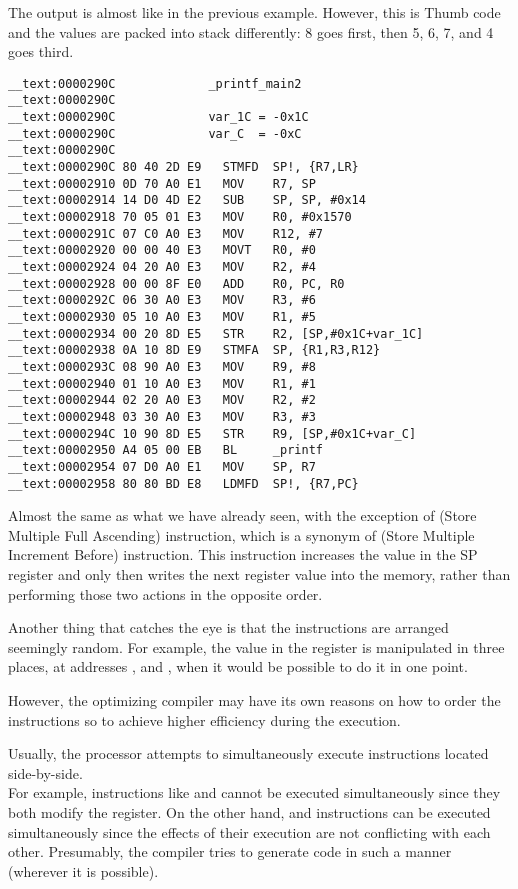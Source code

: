 The output is almost like in the previous example. However, this is Thumb code and the values are packed into stack differently: 
8 goes first, then 5, 6, 7, and 4 goes third.

\myparagraph{\OptimizingXcodeIV: \ARMMode}

\begin{lstlisting}[style=customasmARM]
__text:0000290C             _printf_main2
__text:0000290C
__text:0000290C             var_1C = -0x1C
__text:0000290C             var_C  = -0xC
__text:0000290C
__text:0000290C 80 40 2D E9   STMFD  SP!, {R7,LR}
__text:00002910 0D 70 A0 E1   MOV    R7, SP
__text:00002914 14 D0 4D E2   SUB    SP, SP, #0x14
__text:00002918 70 05 01 E3   MOV    R0, #0x1570
__text:0000291C 07 C0 A0 E3   MOV    R12, #7
__text:00002920 00 00 40 E3   MOVT   R0, #0
__text:00002924 04 20 A0 E3   MOV    R2, #4
__text:00002928 00 00 8F E0   ADD    R0, PC, R0
__text:0000292C 06 30 A0 E3   MOV    R3, #6
__text:00002930 05 10 A0 E3   MOV    R1, #5
__text:00002934 00 20 8D E5   STR    R2, [SP,#0x1C+var_1C]
__text:00002938 0A 10 8D E9   STMFA  SP, {R1,R3,R12}
__text:0000293C 08 90 A0 E3   MOV    R9, #8
__text:00002940 01 10 A0 E3   MOV    R1, #1
__text:00002944 02 20 A0 E3   MOV    R2, #2
__text:00002948 03 30 A0 E3   MOV    R3, #3
__text:0000294C 10 90 8D E5   STR    R9, [SP,#0x1C+var_C]
__text:00002950 A4 05 00 EB   BL     _printf
__text:00002954 07 D0 A0 E1   MOV    SP, R7
__text:00002958 80 80 BD E8   LDMFD  SP!, {R7,PC}
\end{lstlisting}

Almost the same as what we have already seen, with the
exception of  (Store Multiple Full Ascending) instruction, which is a synonym of  (Store Multiple Increment Before) instruction. 
This instruction increases the value in the \ac{SP} register and only then writes the next register value into the memory, rather than performing those two actions in the opposite order.

Another thing that catches the eye is that the instructions are arranged seemingly random.
For example, the value in the  register is manipulated in three
places, at addresses ,  and , when it would be possible to do it in one point.

However, the optimizing compiler may have its own reasons on how to order the instructions so to achieve higher efficiency during the execution.

Usually, the processor attempts to simultaneously execute instructions located side-by-side.\\
For example, instructions like  and
 cannot be executed simultaneously since they both modify the  register. 
On the other hand,  and  
instructions can be executed
simultaneously since the effects of their execution are not conflicting with each other.
Presumably, the compiler tries to generate code in such a manner (wherever it is possible).
 
